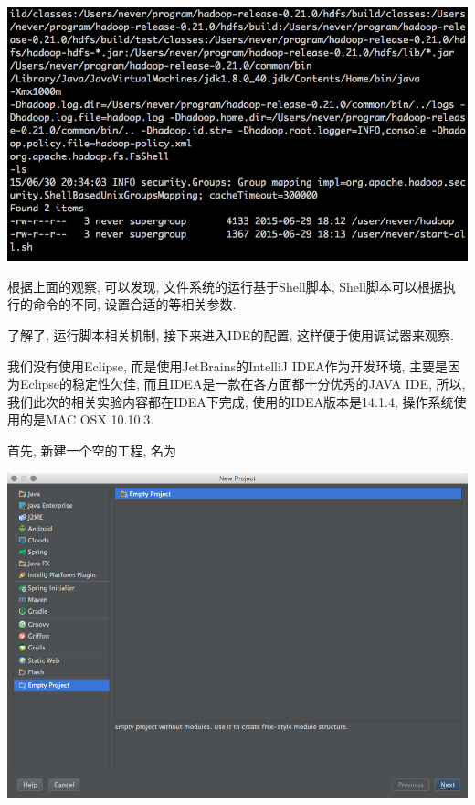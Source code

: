 \includegraphics[width=\textwidth]{image/env/cr20.png}

根据上面的观察, 可以发现, {\Hadoop}文件系统的运行基于Shell脚本,
Shell脚本可以根据执行的命令的不同, 设置合适的{\CPATH}等相关参数.

了解了{\Hadoop}, 运行脚本相关机制, 接下来进入IDE的配置, 这样便于使用调试器来观察.

我们没有使用Eclipse, 而是使用JetBrains的IntelliJ IDEA作为开发环境,
主要是因为Eclipse的稳定性欠佳, 而且IDEA是一款在各方面都十分优秀的JAVA IDE,
所以, 我们此次的相关实验内容都在IDEA下完成, 使用的IDEA版本是14.1.4,
操作系统使用的是MAC OSX 10.10.3.

首先, 新建一个空的工程, 名为{\HadoopCommon}

\includegraphics[width=\textwidth]{image/env/cr21.png}

